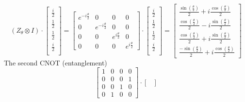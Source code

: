 \documentclass{article}
\begin{document}
\begin{itemize}
	      \[
		      (Z_\theta \otimes I) \cdot \begin{bmatrix}
			      \frac{i}{2} \\
			      \frac{1}{2} \\
			      \frac{1}{2} \\
			      \frac{i}{2} \\
		      \end{bmatrix} =
		      \begin{bmatrix}
			      e^{-i \frac{\theta}{2}} & 0                       & 0                      & 0                      \\
			      0                       & e^{-i \frac{\theta}{2}} & 0                      & 0                      \\
			      0                       & 0                       & e^{i \frac{\theta}{2}} & 0                      \\
			      0                       & 0                       & 0                      & e^{i \frac{\theta}{2}}
		      \end{bmatrix}
		      \cdot
		      \begin{bmatrix}
			      \frac{i}{2} \\
			      \frac{1}{2} \\
			      \frac{1}{2} \\
			      \frac{i}{2} \\
		      \end{bmatrix} =
		      \begin{bmatrix}
			      \frac{\sin \left(\frac{\theta}{2}\right)}{2} + i \frac{\cos \left(\frac{\theta}{2}\right)}{2} \\
			      \frac{\cos \left(\frac{\theta}{2}\right)}{2} - i \frac{\sin \left(\frac{\theta}{2}\right)}{2} \\
			      \frac{\cos \left(\frac{\theta}{2}\right)}{2} + i \frac{\sin \left(\frac{\theta}{2}\right)}{2} \\
			      \frac{-\sin \left(\frac{\theta}{2}\right)}{2} + i \frac{\cos \left(\frac{\theta}{2}\right)}{2}
		      \end{bmatrix}
	      \]
	      The second CNOT (entanglement)
	      \[
		      \begin{bmatrix}
			      1 & 0 & 0 & 0 \\
			      0 & 0 & 0 & 1 \\
			      0 & 0 & 1 & 0 \\
			      0 & 1 & 0 & 0
		      \end{bmatrix}
		      \cdot
		      \begin{bmatrix}

\end{bmatrix}\]
\end{itemize}
\end{document}
